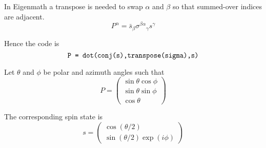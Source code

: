 \documentclass[12pt]{article}
\begin{document}
\noindent
In Eigenmath a transpose is needed to swap $\alpha$ and $\beta$ so that summed-over indices are adjacent.
\begin{equation*}
P^\alpha=\bar s_\beta\sigma^{\beta\alpha}{}_\gamma s^\gamma
\end{equation*}

\noindent
Hence the code is
\begin{equation*}
\text{\tt P = dot(conj(s),transpose(sigma),s)}
\end{equation*}

\noindent
Let $\theta$ and $\phi$ be polar and azimuth angles such that
\begin{equation*}
P=\begin{pmatrix}\sin\theta\cos\phi\\\sin\theta\sin\phi\\\cos\theta\end{pmatrix}
\end{equation*}

\noindent
The corresponding spin state is
\begin{equation*}
s=\begin{pmatrix}\cos(\theta/2)\\\sin(\theta/2)\exp(i\phi)\end{pmatrix}
\end{equation*}
\end{document}
